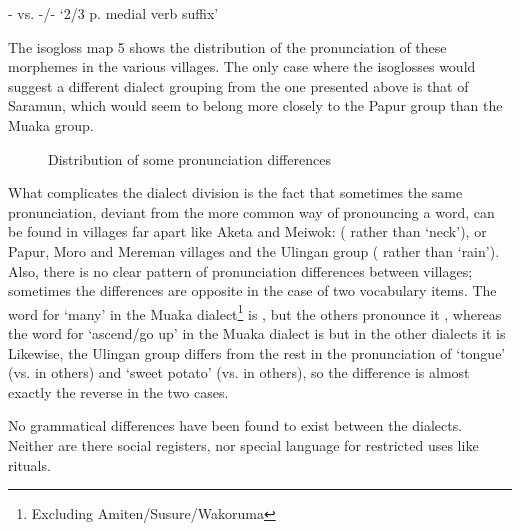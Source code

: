 {}-   vs.  {}-/-      `2/3 p. medial verb suffix'

The isogloss map 5 shows the distribution of the pronunciation of these morphemes in the various villages.  The only case where the isoglosses would suggest a different dialect grouping from the one presented above is that of Saramun, which would seem to belong more closely to the Papur group than the Muaka group.




\begin{figure}
\caption{Distribution of some pronunciation differences}
\label{fig:map:6}
\end{figure}

What complicates the dialect division is the fact that sometimes the same pronunciation, deviant from the more common way of pronouncing a word, can be found in villages far apart like Aketa and Meiwok: ( rather than  `neck'), or Papur,  Moro and Mereman villages and the Ulingan group ( rather than  `rain'). Also, there is no clear pattern of pronunciation differences between villages; sometimes the differences are opposite in the case of two vocabulary items. The word for `many' in the Muaka dialect\footnote{Excluding Amiten/Susure/Wakoruma} is , but the others pronounce it , whereas the word for `ascend/go up' in the Muaka dialect is \emphs{} but in the other dialects it is  Likewise, the Ulingan group differs from the rest in the pronunciation of  `tongue' (vs.  in others) and  `sweet potato' (vs.  in others), so the difference is almost exactly the reverse in the two cases.  

No grammatical differences have been found to exist between the dialects.  Neither are there social registers, nor special language for restricted uses like rituals. 

